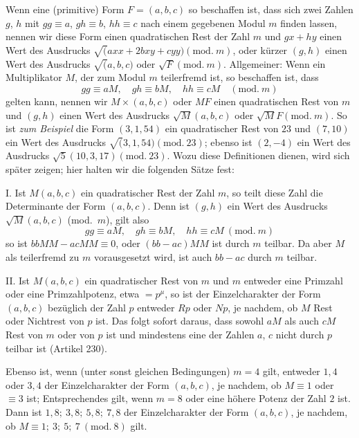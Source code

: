 Wenn eine (primitive) Form $F=(a,b,c)$ so beschaffen ist, dass sich zwei Zahlen $g$, $h$ mit $gg\equiv a$, $gh\equiv b$, $hh\equiv c$ nach einem gegebenen Modul $m$ finden lassen, nennen wir diese Form einen quadratischen Rest der Zahl $m$ und $gx+hy$ einen Wert des Ausdrucks $\surd(axx+2bxy+cyy)(\mathrm{mod.}\ m)$, oder kürzer $(g,h)$ einen Wert des Ausdrucks $\surd(a,b,c)$ oder $\surd F(\mathrm{mod.}\ m)$. Allgemeiner: Wenn ein Multiplikator $M$, der zum Modul $m$ teilerfremd ist, so beschaffen ist, dass
\[
gg\equiv aM,\quad gh\equiv bM,\quad hh\equiv cM\quad (\mathrm{mod.}\ m)
\]
gelten kann, nennen wir $M\times(a,b,c)$ oder $MF$ einen quadratischen Rest von $m$ und $(g,h)$ einen Wert des Ausdrucks $\surd M(a,b,c)$ oder $\surd MF(\mathrm{mod.}\ m)$. So ist \textit{zum Beispiel} die Form $(3,1,54)$ ein quadratischer Rest von $23$ und $(7,10)$ ein Wert des Ausdrucks $\surd(3,1,54)(\mathrm{mod.}\ 23)$; ebenso ist $(2,-4)$ ein Wert des Ausdrucks $\surd5(10,3,17)(\mathrm{mod.}\ 23)$. Wozu diese Definitionen dienen, wird sich später zeigen; hier halten wir die folgenden Sätze fest:

\par
{}
I. Ist $M(a,b,c)$ ein quadratischer Rest der Zahl $m$, so teilt diese Zahl die Determinante der Form $(a,b,c)$. Denn ist $(g,h)$ ein Wert des Ausdrucks $\surd M(a,b,c)$ (mod.\ $m$), gilt also
\[
gg\equiv aM,\quad gh\equiv bM,\quad hh\equiv cM\ (\mathrm{mod.}\ m)
\]
so ist $bbMM-acMM\equiv0$, oder $(bb-ac)MM$ ist durch $m$ teilbar. Da aber $M$ als teilerfremd zu $m$ vorausgesetzt wird, ist auch $bb-ac$ durch $m$ teilbar.

II. Ist $M(a,b,c)$ ein quadratischer Rest von $m$ und $m$ entweder eine Primzahl oder eine Primzahlpotenz, etwa $=p^\mu$, so ist der Einzelcharakter der Form $(a,b,c)$ bezüglich der Zahl $p$ entweder $Rp$ oder $Np$, je nachdem, ob $M$ Rest oder Nichtrest von $p$ ist. Das folgt sofort daraus, dass sowohl $aM$ als auch $cM$ Rest von $m$ oder von $p$ ist und mindestens eine der Zahlen $a$, $c$ nicht durch $p$ teilbar ist (Artikel 230).

Ebenso ist, wenn (unter sonst gleichen Bedingungen) $m=4$ gilt, entweder $1,4$ oder $3,4$ der Einzelcharakter der Form $(a,b,c)$, je nachdem, ob $M\equiv1$ oder $\equiv3$ ist; Entsprechendes gilt, wenn $m=8$ oder eine höhere Potenz der Zahl $2$ ist. Dann ist $1,8;\ 3,8;\ 5,8;\ 7,8$ der Einzelcharakter der Form $(a,b,c)$, je nachdem, ob $M\equiv1;\ 3;\ 5;\ 7\ (\mathrm{mod.}\ 8)$ gilt.

